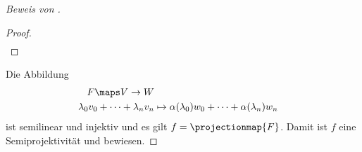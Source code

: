 \begin{proof}[Beweis von ]
\begin{proof}
\begin{align*}
    \end{align*}
  \end{proof}
  Die Abbildung
  \begin{equation*}
    \begin{split}
      F\maps V\to W\\
      \lambda_0 v_0+\dotsb+\lambda_n v_n&\mapsto \alpha(\lambda_0)w_0+\dotsb+\alpha(\lambda_n)w_n
    \end{split}
  \end{equation*}
  ist semilinear und injektiv und es gilt \( f=\projectionmap{F} \). Damit ist \( f \) eine Semiprojektivität und  bewiesen.
\end{proof}